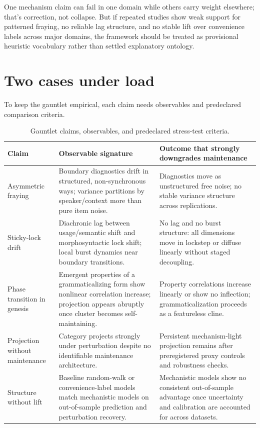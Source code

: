 One mechanism claim can fail in one domain while others carry weight elsewhere; that's correction, not collapse. But if repeated studies show weak support for patterned fraying, no reliable lag structure, and no stable lift over convenience labels across major domains, the framework should be treated as provisional heuristic vocabulary rather than settled explanatory ontology.

\section{Two cases under load}
\label{sec:17:operationalizing}

To keep the gauntlet empirical, each claim needs observables and predeclared comparison criteria.

\begin{table}[htbp]
\centering
\caption{Gauntlet claims, observables, and predeclared stress-test criteria.}
\label{tab:17:gauntlet}
\small
\begin{tabular}{@{}p{}p{}p{}@{}}
\toprule
Claim & Observable signature & Outcome that strongly downgrades maintenance \\
\midrule
Asymmetric fraying & Boundary diagnostics drift in structured, non-synchronous ways; variance partitions by speaker/context more than pure item noise. & Diagnostics move as unstructured free noise; no stable variance structure across replications. \\
\addlinespace
Sticky-lock drift & Diachronic lag between usage/semantic shift and morphosyntactic lock shift; local burst dynamics near boundary transitions. & No lag and no burst structure: all dimensions move in lockstep or diffuse linearly without staged decoupling. \\
\addlinespace
Phase transition in genesis & Emergent properties of a grammaticalizing form show nonlinear correlation increase; projection appears abruptly once cluster becomes self-maintaining. & Property correlations increase linearly or show no inflection; grammaticalization proceeds as a featureless cline. \\
\addlinespace
Projection without maintenance & Category projects strongly under perturbation despite no identifiable maintenance architecture. & Persistent mechanism-light projection remains after preregistered proxy controls and robustness checks. \\
\addlinespace
Structure without lift & Baseline random-walk or convenience-label models match mechanistic models on out-of-sample prediction and perturbation recovery. & Mechanistic models show no consistent out-of-sample advantage once uncertainty and calibration are accounted for across datasets. \\
\bottomrule
\end{tabular}
\end{table}

